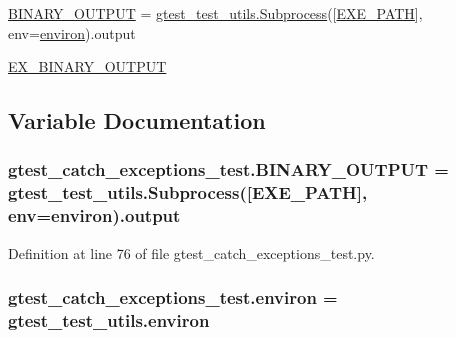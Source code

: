 \begin{DoxyCompactItemize}
\item 
\hyperlink{namespacegtest__catch__exceptions__test_a27d8da05609f357df39614cd41516993}{B\+I\+N\+A\+R\+Y\+\_\+\+O\+U\+T\+P\+UT} = \hyperlink{classgtest__test__utils_1_1_subprocess}{gtest\+\_\+test\+\_\+utils.\+Subprocess}(\mbox{[}\hyperlink{namespacegtest__catch__exceptions__test_a164e7815d55b13a811ce60e2e6f9448d}{E\+X\+E\+\_\+\+P\+A\+TH}\mbox{]}, env=\hyperlink{namespacegtest__catch__exceptions__test_ae51b794c28e667016c180f1b3fc85292}{environ}).output
\item 
\hyperlink{namespacegtest__catch__exceptions__test_a012f2b0e05fd56aa6817595da940c891}{E\+X\+\_\+\+B\+I\+N\+A\+R\+Y\+\_\+\+O\+U\+T\+P\+UT}
\end{DoxyCompactItemize}


\subsection{Variable Documentation}
\subsubsection[{\texorpdfstring{B\+I\+N\+A\+R\+Y\+\_\+\+O\+U\+T\+P\+UT}{BINARY_OUTPUT}}]{\setlength{\rightskip}{0pt plus 5cm}gtest\+\_\+catch\+\_\+exceptions\+\_\+test.\+B\+I\+N\+A\+R\+Y\+\_\+\+O\+U\+T\+P\+UT = {\bf gtest\+\_\+test\+\_\+utils.\+Subprocess}(\mbox{[}{\bf E\+X\+E\+\_\+\+P\+A\+TH}\mbox{]}, env={\bf environ}).output}\hypertarget{namespacegtest__catch__exceptions__test_a27d8da05609f357df39614cd41516993}{}\label{namespacegtest__catch__exceptions__test_a27d8da05609f357df39614cd41516993}


Definition at line 76 of file gtest\+\_\+catch\+\_\+exceptions\+\_\+test.\+py.

\subsubsection[{\texorpdfstring{environ}{environ}}]{\setlength{\rightskip}{0pt plus 5cm}gtest\+\_\+catch\+\_\+exceptions\+\_\+test.\+environ = gtest\+\_\+test\+\_\+utils.\+environ}\hypertarget{namespacegtest__catch__exceptions__test_ae51b794c28e667016c180f1b3fc85292}{}\label{namespacegtest__catch__exceptions__test_ae51b794c28e667016c180f1b3fc85292}


